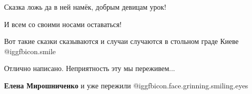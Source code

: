 Сказка ложь да в ней намёк, добрым девицам урок!

И всем со своими носами оставаться!

Вот такие сказки сказываются и случаи случаются в стольном граде Киеве  @igg{fbicon.smile} 

\begin{itemize} %
Отлично написано. Неприятность эту мы переживем...

\textbf{Елена Мирошниченко} и уже пережили  @igg{fbicon.face.grinning.smiling.eyes} 
\end{itemize} %

